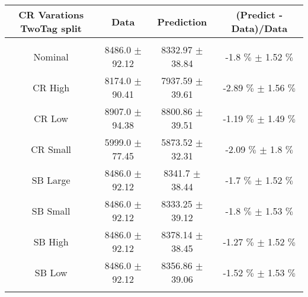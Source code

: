 \begin{footnotesize} 
\begin{tabular}{c|c|c|c} 
CR Varations TwoTag split & Data & Prediction & (Predict - Data)/Data \\ 
\hline\hline 
& & & \\ 
Nominal & 8486.0 $\pm$ 92.12 & 8332.97 $\pm$ 38.84 & -1.8 $\%$  $\pm$ 1.52 $\%$ \\ 
\hline 
CR High & 8174.0 $\pm$ 90.41 & 7937.59 $\pm$ 39.61 & -2.89 $\%$  $\pm$ 1.56 $\%$ \\ 
\hline 
CR Low & 8907.0 $\pm$ 94.38 & 8800.86 $\pm$ 39.51 & -1.19 $\%$  $\pm$ 1.49 $\%$ \\ 
\hline 
CR Small & 5999.0 $\pm$ 77.45 & 5873.52 $\pm$ 32.31 & -2.09 $\%$  $\pm$ 1.8 $\%$ \\ 
\hline 
SB Large & 8486.0 $\pm$ 92.12 & 8341.7 $\pm$ 38.44 & -1.7 $\%$  $\pm$ 1.52 $\%$ \\ 
\hline 
SB Small & 8486.0 $\pm$ 92.12 & 8333.25 $\pm$ 39.12 & -1.8 $\%$  $\pm$ 1.53 $\%$ \\ 
\hline 
SB High & 8486.0 $\pm$ 92.12 & 8378.14 $\pm$ 38.45 & -1.27 $\%$  $\pm$ 1.52 $\%$ \\ 
\hline 
SB Low & 8486.0 $\pm$ 92.12 & 8356.86 $\pm$ 39.06 & -1.52 $\%$  $\pm$ 1.53 $\%$ \\ 
& & & \\ 
\hline\hline 
\end{tabular} 
\end{footnotesize} 
\newline 
